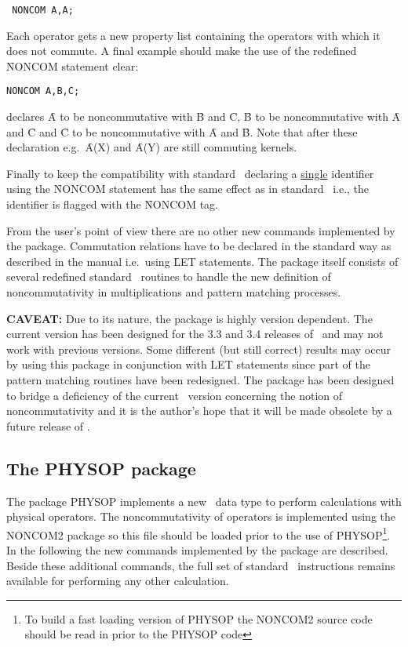\begin{verbatim}
 NONCOM A,A;
\end{verbatim}
Each operator gets a new property list containing the
operators with which it does not commute.
A final example should make
the use of the redefined \f{NONCOM} statement clear: \\

\begin{verbatim}
NONCOM A,B,C;
\end{verbatim}
declares \f{A}  to be noncommutative with \f{B} and \f{C},
\f{B} to be noncommutative
with \f{A} and \f{C} and \f{C} to be noncommutative
with \f{A} and \f{B}.
Note that after these declaration
e.g.\ \f{A(X)} and \f{A(Y)}
are still commuting kernels.

Finally to keep the compatibility with standard \REDUCE\, declaring a
\underline{single} identifier using the \f{NONCOM} statement has the same
effect as in
standard \REDUCE\, i.e., the identifier is flagged with the \f{NONCOM} tag.

From the user's point of view there are no other
new commands implemented by the package. Commutation
relations have to be declared in the standard way as described in
the manual i.e.\ using
\f{LET} statements. The package itself consists of several redefined
standard
\REDUCE\ routines to handle the new definition of noncommutativity in
multiplications and pattern matching processes.

{\bf CAVEAT: } Due to its nature, the package is highly version
dependent. The current version has been designed for the 3.3  and 3.4
releases
of \REDUCE\ and may not work with previous versions. Some different
(but still correct) results may occur by using this package in
conjunction with
LET statements since part of the pattern matching routines have been
redesigned. The package has been designed to bridge a deficiency of the
current \REDUCE\ version concerning the notion of noncommutativity
 and it is the author's hope that it will be made  obsolete
by a future release of \REDUCE.

\subsection{The PHYSOP package}

The package PHYSOP implements a new \REDUCE\ data type to perform
calculations with physical operators. The noncommutativity of
operators is
implemented using the NONCOM2 package so this file should be loaded
prior to the use of PHYSOP\footnote{To build a fast
loading version of PHYSOP the NONCOM2
source code should be read in prior to the PHYSOP
code}.
In the following the new commands  implemented by the package
are described.  Beside these additional commands,
the full set of standard \REDUCE\ instructions remains
available for performing  any other calculation.

